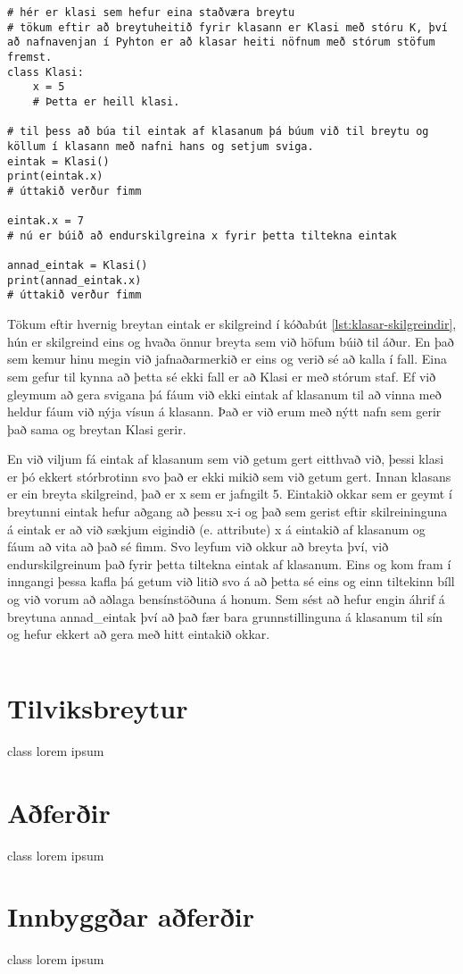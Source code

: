 \begin{lstlisting}[caption=Klasar skilgreindir, label=lst:klasar-skilgreindir]
# hér er klasi sem hefur eina staðværa breytu
# tökum eftir að breytuheitið fyrir klasann er Klasi með stóru K, því að nafnavenjan í Pyhton er að klasar heiti nöfnum með stórum stöfum fremst.
class Klasi:
	x = 5
	# Þetta er heill klasi.
	
# til þess að búa til eintak af klasanum þá búum við til breytu og köllum í klasann með nafni hans og setjum sviga.
eintak = Klasi()
print(eintak.x)
# úttakið verður fimm

eintak.x = 7
# nú er búið að endurskilgreina x fyrir þetta tiltekna eintak

annad_eintak = Klasi()
print(annad_eintak.x)
# úttakið verður fimm 
\end{lstlisting}

Tökum eftir hvernig breytan eintak er skilgreind í kóðabút \ref{lst:klasar-skilgreindir}, hún er skilgreind eins og hvaða önnur breyta sem við höfum búið til áður.
En það sem kemur hinu megin við jafnaðarmerkið er eins og verið sé að kalla í fall.
Eina sem gefur til kynna að þetta sé ekki fall er að Klasi er með stórum staf.
Ef við gleymum að gera svigana þá fáum við ekki eintak af klasanum til að vinna með heldur fáum við nýja vísun á klasann.
Það er við erum með nýtt nafn sem gerir það sama og breytan Klasi gerir.

En við viljum fá eintak af klasanum sem við getum gert eitthvað við, þessi klasi er þó ekkert stórbrotinn svo það er ekki mikið sem við getum gert.
Innan klasans er ein breyta skilgreind, það er x sem er jafngilt 5.
Eintakið okkar sem er geymt í breytunni eintak hefur aðgang að þessu x-i og það sem gerist eftir skilreininguna á eintak er að við sækjum eigindið (e. attribute) x á eintakið af klasanum og fáum að vita að það sé fimm.
Svo leyfum við okkur að breyta því, við endurskilgreinum það fyrir þetta tiltekna eintak af klasanum.
Eins og kom fram í inngangi þessa kafla þá getum við litið svo á að þetta sé eins og einn tiltekinn bíll og við vorum að aðlaga bensínstöðuna á honum.
Sem sést að hefur engin áhrif á breytuna annad\_eintak því að það fær bara grunnstillinguna á klasanum til sín og hefur ekkert að gera með hitt eintakið okkar.

\begin{lstlisting}[caption=Klasar skilgreindir með töfraaðferðinni \_\_init\_\_, label=lst:klasar-notkun]

\end{lstlisting}

\section{Tilviksbreytur}\label{uk:klasar-tilviksbreytur}
class lorem ipsum

\section{Aðferðir}\label{uk:klasar-aðferðir}
class lorem ipsum

\section{Innbyggðar aðferðir}\label{uk:klasar-innbyggðar-aðferðir}
class lorem ipsum